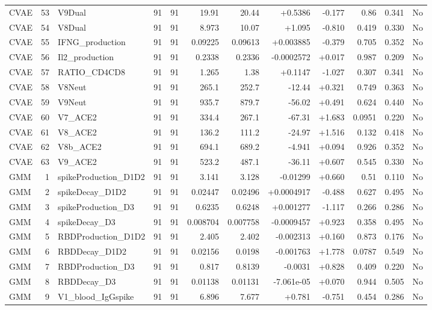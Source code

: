 \begin{landscape}
\begin{longtable}{@{}lrp{4.0cm}rrrrrrrrr@{}}
CVAE & 53 & V9Dual & 91 & 91 & 19.91 & 20.44 & +0.5386 & -0.177 & 0.86 & 0.341 & No \\
CVAE & 54 & V8Dual & 91 & 91 & 8.973 & 10.07 & +1.095 & -0.810 & 0.419 & 0.330 & No \\
CVAE & 55 & IFNG\_production & 91 & 91 & 0.09225 & 0.09613 & +0.003885 & -0.379 & 0.705 & 0.352 & No \\
CVAE & 56 & Il2\_production & 91 & 91 & 0.2338 & 0.2336 & -0.0002572 & +0.017 & 0.987 & 0.209 & No \\
CVAE & 57 & RATIO\_CD4CD8 & 91 & 91 & 1.265 & 1.38 & +0.1147 & -1.027 & 0.307 & 0.341 & No \\
CVAE & 58 & V8Neut & 91 & 91 & 265.1 & 252.7 & -12.44 & +0.321 & 0.749 & 0.363 & No \\
CVAE & 59 & V9Neut & 91 & 91 & 935.7 & 879.7 & -56.02 & +0.491 & 0.624 & 0.440 & No \\
CVAE & 60 & V7\_ACE2 & 91 & 91 & 334.4 & 267.1 & -67.31 & +1.683 & 0.0951 & 0.220 & No \\
CVAE & 61 & V8\_ACE2 & 91 & 91 & 136.2 & 111.2 & -24.97 & +1.516 & 0.132 & 0.418 & No \\
CVAE & 62 & V8b\_ACE2 & 91 & 91 & 694.1 & 689.2 & -4.941 & +0.094 & 0.926 & 0.352 & No \\
CVAE & 63 & V9\_ACE2 & 91 & 91 & 523.2 & 487.1 & -36.11 & +0.607 & 0.545 & 0.330 & No \\
GMM & 1 & spikeProduction\_D1D2 & 91 & 91 & 3.141 & 3.128 & -0.01299 & +0.660 & 0.51 & 0.110 & No \\
GMM & 2 & spikeDecay\_D1D2 & 91 & 91 & 0.02447 & 0.02496 & +0.0004917 & -0.488 & 0.627 & 0.495 & No \\
GMM & 3 & spikeProduction\_D3 & 91 & 91 & 0.6235 & 0.6248 & +0.001277 & -1.117 & 0.266 & 0.286 & No \\
GMM & 4 & spikeDecay\_D3 & 91 & 91 & 0.008704 & 0.007758 & -0.0009457 & +0.923 & 0.358 & 0.495 & No \\
GMM & 5 & RBDProduction\_D1D2 & 91 & 91 & 2.405 & 2.402 & -0.002313 & +0.160 & 0.873 & 0.176 & No \\
GMM & 6 & RBDDecay\_D1D2 & 91 & 91 & 0.02156 & 0.0198 & -0.001763 & +1.778 & 0.0787 & 0.549 & No \\
GMM & 7 & RBDProduction\_D3 & 91 & 91 & 0.817 & 0.8139 & -0.0031 & +0.828 & 0.409 & 0.220 & No \\
GMM & 8 & RBDDecay\_D3 & 91 & 91 & 0.01138 & 0.01131 & -7.061e-05 & +0.070 & 0.944 & 0.505 & No \\
GMM & 9 & V1\_blood\_IgGspike & 91 & 91 & 6.896 & 7.677 & +0.781 & -0.751 & 0.454 & 0.286 & No \\

\end{longtable}
\end{landscape}
